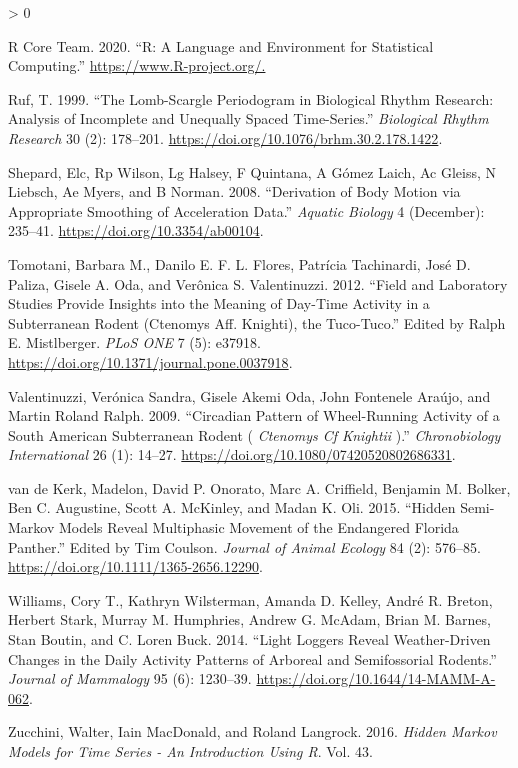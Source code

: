 \documentclass[english,msc,numbers,hidelinks]{coppe}
\newlength{\cslhangindent}
\newenvironment{CSLReferences}[2] %
 {%
  \setlength{\parindent}{0pt}
  \ifodd #1 \everypar{\setlength{\hangindent}{\cslhangindent}}\ignorespaces\fi
  \ifnum #2 > 0
  \setlength{\parskip}{#2\baselineskip}
  \fi
 }%
 {}
\begin{document}
\begin{CSLReferences}{1}{0}
  \leavevmode\hypertarget{ref-rcoreteam2020}{}%
  R Core Team. 2020. {``R: A Language and Environment for Statistical Computing.''} \url{https://www.R-project.org/.}

  \leavevmode\hypertarget{ref-ruf1999}{}%
  Ruf, T. 1999. {``The Lomb-Scargle Periodogram in Biological Rhythm Research: Analysis of Incomplete and Unequally Spaced Time-Series.''} \emph{Biological Rhythm Research} 30 (2): 178--201. \url{https://doi.org/10.1076/brhm.30.2.178.1422}.

  \leavevmode\hypertarget{ref-shepard2008}{}%
  Shepard, Elc, Rp Wilson, Lg Halsey, F Quintana, A Gómez Laich, Ac Gleiss, N Liebsch, Ae Myers, and B Norman. 2008. {``Derivation of Body Motion via Appropriate Smoothing of Acceleration Data.''} \emph{Aquatic Biology} 4 (December): 235--41. \url{https://doi.org/10.3354/ab00104}.

  \leavevmode\hypertarget{ref-tomotani2012}{}%
  Tomotani, Barbara M., Danilo E. F. L. Flores, Patrícia Tachinardi, José D. Paliza, Gisele A. Oda, and Verônica S. Valentinuzzi. 2012. {``Field and Laboratory Studies Provide Insights into the Meaning of Day-Time Activity in a Subterranean Rodent (Ctenomys Aff. Knighti), the Tuco-Tuco.''} Edited by Ralph E. Mistlberger. \emph{PLoS ONE} 7 (5): e37918. \url{https://doi.org/10.1371/journal.pone.0037918}.

  \leavevmode\hypertarget{ref-valentinuzzi2009}{}%
  Valentinuzzi, Verónica Sandra, Gisele Akemi Oda, John Fontenele Araújo, and Martin Roland Ralph. 2009. {``Circadian Pattern of Wheel{-}Running Activity of a South American Subterranean Rodent ( {\emph{Ctenomys Cf Knightii}} ).''} \emph{Chronobiology International} 26 (1): 14--27. \url{https://doi.org/10.1080/07420520802686331}.

  \leavevmode\hypertarget{ref-vandekerk2015}{}%
  van de Kerk, Madelon, David P. Onorato, Marc A. Criffield, Benjamin M. Bolker, Ben C. Augustine, Scott A. McKinley, and Madan K. Oli. 2015. {``Hidden Semi-Markov Models Reveal Multiphasic Movement of the Endangered Florida Panther.''} Edited by Tim Coulson. \emph{Journal of Animal Ecology} 84 (2): 576--85. \url{https://doi.org/10.1111/1365-2656.12290}.

  \leavevmode\hypertarget{ref-williams2014}{}%
  Williams, Cory T., Kathryn Wilsterman, Amanda D. Kelley, André R. Breton, Herbert Stark, Murray M. Humphries, Andrew G. McAdam, Brian M. Barnes, Stan Boutin, and C. Loren Buck. 2014. {``Light Loggers Reveal Weather-Driven Changes in the Daily Activity Patterns of Arboreal and Semifossorial Rodents.''} \emph{Journal of Mammalogy} 95 (6): 1230--39. \url{https://doi.org/10.1644/14-MAMM-A-062}.

  \leavevmode\hypertarget{ref-zucchini2016}{}%
  Zucchini, Walter, Iain MacDonald, and Roland Langrock. 2016. \emph{Hidden Markov Models for Time Series - An Introduction Using R}. Vol. 43.

  \end{CSLReferences}
\end{document}
